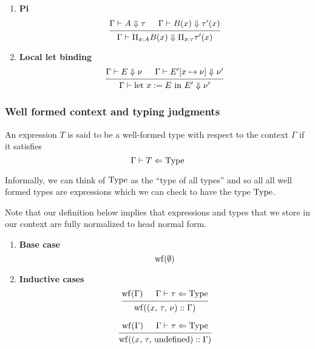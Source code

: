 \documentclass{article}
\begin{document}
\begin{enumerate}
\item \textbf{Pi} \\
  \[
    \begin{prooftree}
      \hypo{\Gamma \vdash A \Downarrow \tau}
      \hypo{\Gamma \vdash B(x) \Downarrow \tau'(x)}
      \infer2{\Gamma \vdash \Pi_{x : A} B(x) \Downarrow \Pi_{x : \tau} \tau'(x)}
    \end{prooftree}
  \]

\item \textbf{Local let binding} \\
    \[
      \begin{prooftree}
        \hypo{\Gamma \vdash E \Downarrow \nu}
        \hypo{\Gamma \vdash E'[x \mapsto \nu] \Downarrow \nu'}
        \infer2{\Gamma \vdash \text{let } x := E \text{ in } E' \Downarrow \nu'}
      \end{prooftree}
    \]
\end{enumerate}

\subsubsection{Well formed context and typing judgments}
\begin{definition} 
  An expression $T$ is said to be a well-formed type with respect to the context
  $\Gamma$ if it satisfies
  \[ \Gamma \vdash T \Leftarrow \operatorname{Type} \]

  Informally, we can think of $\operatorname{Type}$ as the ``type of all types'' and so all
  all well formed types are
  expressions which we can check to have the type $\operatorname{Type}$.
\end{definition}

\begin{definition} 
  Note that our definition below implies that expressions and types that we
  store in our context are fully normalized to head normal form.

  \begin{enumerate}
  \item \textbf{Base case} \\
    \[
      \begin{prooftree}
        \hypo{\wf(\emptyset)}
      \end{prooftree}
    \]

  \item \textbf{Inductive cases} \\
    \[
      \begin{prooftree}
        \hypo{\wf(\Gamma)}
        \hypo{\Gamma \vdash \tau \Leftarrow \Type}
        \infer2{\wf ((x, \, \tau, \, \nu) :: \Gamma)}
      \end{prooftree}
    \]

    \[
      \begin{prooftree}
        \hypo{\wf(\Gamma)}
        \hypo{\Gamma \vdash \tau \Leftarrow \Type}
        \infer2{\wf ((x, \, \tau, \, \text{undefined}) :: \Gamma)}
      \end{prooftree}
    \]
  \end{enumerate}
\end{definition}
\end{document}
